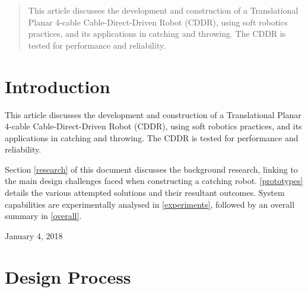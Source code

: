 \documentclass[conference]{IEEEtran}
\begin{document}
	
	
	
	
	
	
	
	\maketitle
	
	\begin{abstract}
This article discusses the development and construction of a Translational Planar 4-cable Cable-Direct-Driven Robot (CDDR), using soft robotics practices, and its applications in catching and throwing. The CDDR is tested for performance and reliability.
	\end{abstract}
	
	
	
	
	
	\IEEEpeerreviewmaketitle
	
	
	
	\section{Introduction}
This article discusses the development and construction of a Translational Planar 4-cable Cable-Direct-Driven Robot (CDDR), using soft robotics practices, and its applications in catching and throwing. The CDDR is tested for performance and reliability.

Section \ref{research} of this document discusses the background research, linking to the main design challenges faced when constructing a catching robot. \ref{prototypes} details the various attempted solutions and their resultant outcomes. System capabilities are experimentally analysed in \ref{experiments}, followed by an overall summary in \ref{overall}.



\hfill January 4, 2018


\section{Design Process}
\end{document}

